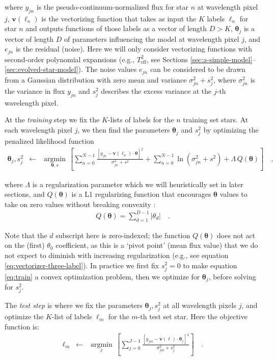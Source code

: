 \documentclass[preprint]{aastex}
\newcommand{\teff}{T_{\mathrm{eff}}}
\newcommand{\Dvector}[1]{\boldsymbol{#1}}
\newcommand{\vectheta}{\Dvector{\theta}}
\newcommand{\vecv}{\Dvector{v}}
\newcommand{\argmin}[1]{\underset{#1}{\operatorname{argmin}}\,}
\begin{document}
\noindent{}where $y_{jn}$ is the pseudo-continuum-normalized flux for star $n$ at wavelength pixel
$j$, $\vecv(\ell_n)$ is the vectorizing function that takes as input the $K$ labels
$\ell_n$ for star $n$ and outputs functions of those labels as a vector of length
$D>K$, $\vectheta_j$ is a vector of length $D$ of parameters influencing the model at
wavelength pixel $j$, and $e_{jn}$ is the residual (noise).  Here we will only consider
vectorizing functions with second-order polynomial expansions (e.g., $\teff^2$, see Sections 
\ref{sec:a-simple-model}--\ref{sec:evolved-star-model}).  The noise values $e_{jn}$ can 
be considered to be drawn from a Gaussian distribution with zero mean and variance 
$\sigma_{jn}^2 + s_j^2$, where $\sigma_{jn}^2$ is the variance in flux $y_{jn}$ and 
$s_j^2$ describes the excess variance at the $j$-th wavelength pixel. 


At the \emph{training} step we fix the $K$-lists of labels for the $n$ training set stars.
At each wavelength pixel $j$, we then find the parameters $\vectheta_j$ and $s_j^2$
by optimizing the penalized likelihood function
\begin{eqnarray}\label{eq:train}
\vectheta_j,s^2_j &\leftarrow& \argmin{\vectheta,s}\left[
    \sum_{n=0}^{N-1} \frac{[y_{jn}-\vecv(\ell_n)\cdot\vectheta]^2}{\sigma^2_{jn}+s^2}
    + \sum_{n=0}^{N-1} \ln(\sigma^2_{jn}+s^2) + \Lambda{}\,Q(\vectheta)
    \right]
  \quad ,
\end{eqnarray}

\noindent{}where $\Lambda$ is a regularization parameter which we will heuristically set
in later sections, and $Q(\vectheta)$ is a L1 regularizing function that encourages 
$\vectheta$ values to take on zero values without breaking convexity \citep{Casey_2016b}:
\begin{eqnarray}\label{eq:regularization-function}
	Q(\vectheta) = \sum_{d=1}^{D-1} |{\theta_d}| \quad .
\end{eqnarray}

Note that the $d$ subscript here is zero-indexed; the function $Q(\vectheta)$ does not act
on the (first) $\theta_0$ coefficient, as this is a `pivot point' (mean flux value) that 
we do not expect to diminish with increasing regularization (e.g., see equation 
\ref{eq:vectorizer-three-label}).  In practice we first fix $s_j^2 = 0$ to make equation
\ref{eq:train} a convex optimization problem, then we optimize for $\vectheta_j$, before 
solving for $s_j^2$.  


The \emph{test step} is where we fix the parameters $\vectheta_j,s_j^2$ at all wavelength
pixels $j$, and optimize the $K$-list of labels $\ell_m$ for the $m$-th test set star.  Here
the objective function is:
\begin{eqnarray}\label{eq:test}
  \ell_m &\leftarrow& \argmin{\ell}\left[
    \sum_{j=0}^{J-1} \frac{[y_{jm}-\vecv(\ell)\cdot\vectheta_j]^2}{\sigma_{jm}^2 + s_j^2}
    \right]
  \quad .
\end{eqnarray}
\end{document}
